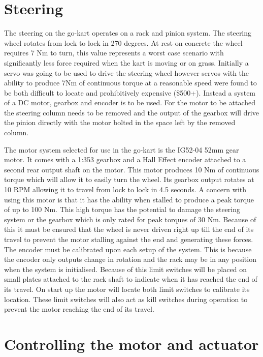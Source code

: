 \section{Steering}

The steering on the go-kart operates on a rack and pinion system. The steering
wheel rotates from lock to lock in 270 degrees. At rest on concrete the wheel
requires 7 Nm to turn, this value represents a worst case scenario with
significantly less force required when the kart is moving or on grass. Initially
a servo was going to be used to drive the steering wheel however servos with the
ability to produce 7Nm of continuous torque at a reasonable speed were found to
be both difficult to locate and prohibitively expensive (\$500+). Instead a
system of a DC motor, gearbox and encoder is to be used. For the motor to be
attached the steering column needs to be removed and the output of the gearbox
will drive the pinion directly with the motor bolted in the space left by the
removed column. %

The motor system selected for use in the go-kart is the IG52-04 52mm gear motor.
It comes with a 1:353 gearbox and a Hall Effect encoder attached to a second
rear output shaft on the motor. This motor produces 10 Nm of continuous torque
which will allow it to easily turn the wheel. Its gearbox output rotates at 10
RPM allowing it to travel from lock to lock in 4.5 seconds. A concern with using
this motor is that it has the ability when stalled to produce a peak torque of
up to 100 Nm. This high torque has the potential to damage the steering system
or the gearbox which is only rated for peak torques of 30 Nm. Because of this it
must be ensured that the wheel is never driven right up till the end of its
travel to prevent the motor stalling against the end and generating these
forces. The encoder must be calibrated upon each setup of the system. This is
because the encoder only outputs change in rotation and the rack may be in any
position when the system is initialised. Because of this limit switches will be
placed on small plates attached to the rack shaft to indicate when it has
reached the end of its travel. On start up the motor will locate both limit
switches to calibrate its location. These limit switches will also act as kill
switches during operation to prevent the motor reaching the end of its travel.

\section{Controlling the motor and actuator}


